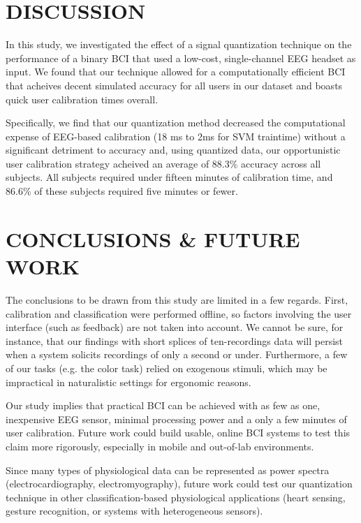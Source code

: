 \section{\uppercase{Discussion}}

\noindent In this study, we investigated the effect of a signal quantization technique on the performance of a binary BCI that used a low-cost, single-channel EEG headset as input. We found that our technique allowed for a computationally efficient BCI that acheives decent simulated accuracy for all users in our dataset and boasts quick user calibration times overall. 

Specifically, we find that our quantization method decreased the computational expense of EEG-based calibration (18 ms to 2ms for SVM traintime) without a significant detriment to accuracy and, using quantized data, our opportunistic user calibration strategy acheived an average of 88.3\% accuracy across all subjects. All subjects required under fifteen minutes of calibration time, and 86.6\% of these subjects required five minutes or fewer.



\section{\uppercase{Conclusions \& Future work}}

The conclusions to be drawn from this study are limited in a few regards. First, calibration and classification were performed offline, so factors involving the user interface (such as feedback) are not taken into account. We cannot be sure, for instance, that our findings with short splices of ten-recordings data will persist when a system solicits recordings of only a second or under. Furthermore, a few of our tasks (e.g. the color task) relied on exogenous stimuli, which may be impractical in naturalistic settings for ergonomic reasons. 

Our study implies that practical BCI can be achieved with as few as one, inexpensive EEG sensor, minimal processing power and a only a few minutes of user calibration. Future work could build usable, online BCI systems to test this claim more rigorously, especially in mobile and out-of-lab environments.

Since many types of physiological data can be represented as power spectra (electrocardiography, electromyography), future work could test our quantization technique in other classification-based physiological applications (heart sensing, gesture recognition, or systems with heterogeneous sensors).


